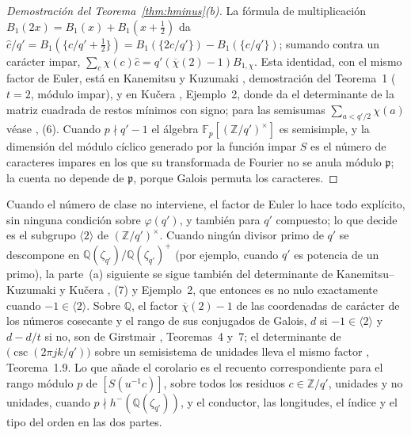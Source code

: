 \documentclass[11pt,a4paper]{article}
\theoremstyle{definition}
\newcommand{\ZZ}{\mathbb{Z}}
\newcommand{\QQ}{\mathbb{Q}}
\newcommand{\FF}{\mathbb{F}}
\begin{document}
\begin{proof}[Demostración del Teorema~\ref{thm:hminus}(b)]
La fórmula de multiplicación $B_1(2x)=B_1(x)+B_1(x+\tfrac12)$ da
$\hat c/q'=B_1(\{c/q'+\tfrac12\})=B_1(\{2c/q'\})-B_1(\{c/q'\})$; sumando contra un carácter impar,
$\sum_c\chi(c)\hat c=q'(\overline\chi(2)-1)B_{1,\chi}$. Esta identidad, con el mismo factor de Euler, está en Kanemitsu y
Kuzumaki \cite{KK01}, demostración del Teorema~1 ($t=2$, módulo impar), y en Kučera \cite{Kuc01}, Ejemplo~2, donde da el
determinante de la matriz cuadrada de restos mínimos con signo; para las semisumas $\sum_{a<q'/2}\chi(a)$ véase
\cite{SUZ95}, (6). Cuando $p\nmid q'-1$ el álgebra $\FF_p[(\ZZ/q')^\times]$ es semisimple, y la dimensión del
módulo cíclico generado por la función impar $S$ es el número de caracteres impares en los que su transformada de
Fourier no se anula módulo $\mathfrak p$; la cuenta no depende de $\mathfrak p$, porque Galois permuta los
caracteres.
\end{proof}

\noindent Cuando el número de clase no interviene, el factor de Euler lo hace todo explícito, sin ninguna condición
sobre $\varphi(q')$, y también para $q'$ compuesto; lo que decide es el subgrupo $\langle2\rangle$ de $(\ZZ/q')^\times$.
Cuando ningún divisor primo de $q'$ se descompone en $\QQ(\zeta_{q'})/\QQ(\zeta_{q'})^+$ (por ejemplo, cuando $q'$ es
potencia de un primo), la parte~(a) siguiente se sigue también del determinante de Kanemitsu--Kuzumaki \cite{KK01} y
Kučera \cite{Kuc01}, (7) y Ejemplo~2, que entonces es no nulo exactamente cuando $-1\in\langle2\rangle$. Sobre $\QQ$,
el factor $\overline\chi(2)-1$ de las coordenadas de carácter de los números cosecante y el rango de sus conjugados de
Galois, $d$ si $-1\in\langle2\rangle$ y $d-d/t$ si no, son de Girstmair \cite{Gir87}, Teoremas~4 y~7; el determinante de
$\bigl(\csc(2\pi jk/q')\bigr)$ sobre un semisistema de unidades lleva el mismo factor \cite{GG25}, Teorema~1.9. Lo que añade el
corolario es el recuento correspondiente para el rango módulo $p$ de $[S(u^{-1}c)]$, sobre todos los residuos
$c\in\ZZ/q'$, unidades y no unidades, cuando $p\nmid h^-(\QQ(\zeta_{q'}))$, y el
conductor, las longitudes, el índice y el tipo del orden en las dos partes.
\end{document}
